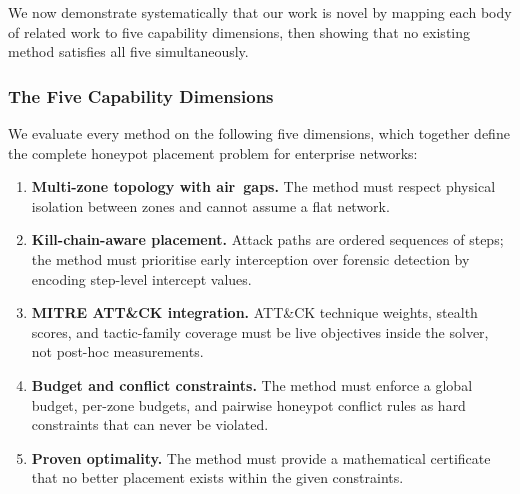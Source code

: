 \documentclass[journal]{IEEEtran}
\begin{document}
We now demonstrate systematically that our work is novel by
mapping each body of related work to five capability
dimensions, then showing that no existing method satisfies
all five simultaneously.

\subsubsection{The Five Capability Dimensions}

We evaluate every method on the following five dimensions,
which together define the complete honeypot placement problem
for enterprise networks:

\begin{enumerate}
  \item[\textbf{D1}] \textbf{Multi-zone topology with
  air~gaps.}  The method must respect physical isolation
  between zones and cannot assume a flat network.

  \item[\textbf{D2}] \textbf{Kill-chain-aware placement.}
  Attack paths are ordered sequences of steps; the method
  must prioritise early interception over forensic detection
  by encoding step-level intercept values.

  \item[\textbf{D3}] \textbf{MITRE ATT\&CK integration.}
  ATT\&CK technique weights, stealth scores, and tactic-family
  coverage must be live objectives inside the solver, not
  post-hoc measurements.

  \item[\textbf{D4}] \textbf{Budget and conflict
  constraints.}  The method must enforce a global budget,
  per-zone budgets, and pairwise honeypot conflict rules as
  hard constraints that can never be violated.

  \item[\textbf{D5}] \textbf{Proven optimality.}  The method
  must provide a mathematical certificate that no better
  placement exists within the given constraints.
\end{enumerate}
\end{document}
